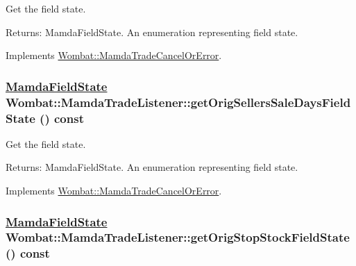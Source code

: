 Get the field state. 

\begin{Desc}
\item[Returns:]Mamda\-Field\-State. An enumeration representing field state. \end{Desc}


Implements \hyperlink{classWombat_1_1MamdaTradeCancelOrError_9ce7c8f5f35a4a4caacf5ed43637f067}{Wombat::Mamda\-Trade\-Cancel\-Or\-Error}.\hypertarget{classWombat_1_1MamdaTradeListener_e4e53df493af564fb26c91e1cf6f0a0e}{
\subsubsection[getOrigSellersSaleDaysFieldState]{\setlength{\rightskip}{0pt plus 5cm}\hyperlink{namespaceWombat_93aac974f2ab713554fd12a1fa3b7d2a}{Mamda\-Field\-State} Wombat::Mamda\-Trade\-Listener::get\-Orig\-Sellers\-Sale\-Days\-Field\-State () const}}
\label{classWombat_1_1MamdaTradeListener_e4e53df493af564fb26c91e1cf6f0a0e}


Get the field state. 

\begin{Desc}
\item[Returns:]Mamda\-Field\-State. An enumeration representing field state. \end{Desc}


Implements \hyperlink{classWombat_1_1MamdaTradeCancelOrError_75ac88d2442d768d3094a8263329adc2}{Wombat::Mamda\-Trade\-Cancel\-Or\-Error}.\hypertarget{classWombat_1_1MamdaTradeListener_f877c87cdd8ba3db4e1c41f8465ed249}{
\subsubsection[getOrigStopStockFieldState]{\setlength{\rightskip}{0pt plus 5cm}\hyperlink{namespaceWombat_93aac974f2ab713554fd12a1fa3b7d2a}{Mamda\-Field\-State} Wombat::Mamda\-Trade\-Listener::get\-Orig\-Stop\-Stock\-Field\-State () const}}
\label{classWombat_1_1MamdaTradeListener_f877c87cdd8ba3db4e1c41f8465ed249}


